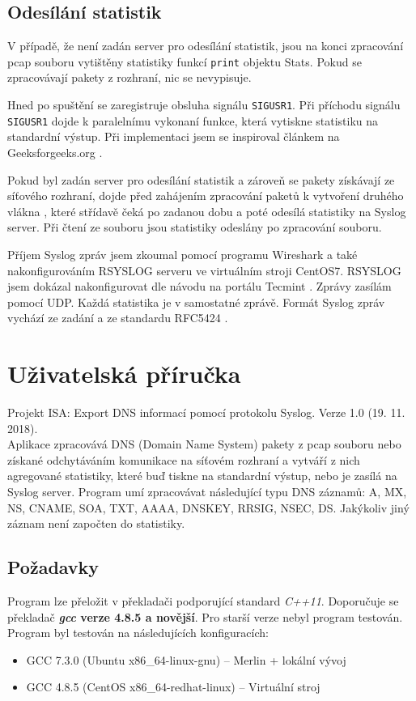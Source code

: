 \documentclass[11pt,a4paper]{article}
\begin{document}
\subsection{Odesílání statistik}
V případě, že není zadán server pro odesílání statistik, jsou na konci zpracování pcap souboru vytištěny statistiky funkcí \texttt{print} objektu Stats. Pokud se zpracovávají pakety z rozhraní, nic se nevypisuje.

Hned po spuštění se zaregistruje obsluha signálu \texttt{SIGUSR1}. Při příchodu signálu \texttt{SIGUSR1} dojde k paralelnímu vykonaní funkce, která vytiskne statistiku na standardní výstup. Při implementaci jsem se inspiroval článkem na Geeksforgeeks.org \cite{signals}.

Pokud byl zadán server pro odesílání statistik a zároveň se pakety získávají ze síťového rozhraní, dojde před zahájením zpracování paketů k vytvoření druhého vlákna \cite{threads}, které střídavě čeká po zadanou dobu a poté odesílá statistiky na Syslog server. Při čtení ze souboru jsou statistiky odeslány po zpracování souboru.

Příjem Syslog zpráv jsem zkoumal pomocí programu Wireshark a také nakonfigurováním RSYSLOG serveru ve virtuálním stroji CentOS7. RSYSLOG jsem dokázal nakonfigurovat dle návodu na portálu Tecmint \cite{syslog-setup}. Zprávy zasílám pomocí UDP. Každá statistika je v samostatné zprávě. Formát Syslog zpráv vychází ze zadání a ze standardu RFC5424 \cite{rfc5424}.

\section{Uživatelská příručka}
Projekt ISA: Export DNS informací pomocí protokolu Syslog. Verze 1.0 (19. 11. 2018).\\
Aplikace zpracovává DNS (Domain Name System) pakety z pcap souboru nebo získané odchytáváním komunikace na síťovém rozhraní a vytváří z nich agregované statistiky, které buď tiskne na standardní výstup, nebo je zasílá na Syslog server. Program umí zpracovávat následující typu DNS záznamů: A, MX, NS, CNAME, SOA, TXT, AAAA, DNSKEY, RRSIG, NSEC, DS. Jakýkoliv jiný záznam není započten do statistiky.

\subsection{Požadavky}
Program lze přeložit v překladači podporující standard \textit{C++11}. Doporučuje se překladač \textbf{\textit{gcc} verze 4.8.5 a novější}. Pro starší verze nebyl program testován.
Program byl testován na následujících konfiguracích:
\begin{itemize}
\item GCC 7.3.0 (Ubuntu x86\_64-linux-gnu) -- Merlin + lokální vývoj
\item GCC 4.8.5 (CentOS x86\_64-redhat-linux) -- Virtuální stroj
\end{itemize}
\end{document}
